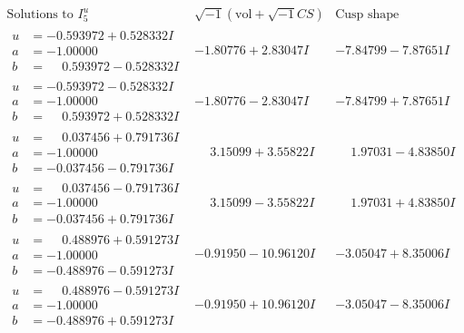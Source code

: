 \documentclass[1p]{elsarticle_modified}
\theoremstyle{definition}
\newcommand{\I}{\sqrt{-1}}
\begin{document}
$$\begin{array}{c|c|c}  
\text{Solutions to }I^u_{5}& \I (\text{vol} + \sqrt{-1}CS) & \text{Cusp shape}\\
 \hline 
\begin{aligned}
u &= -0.593972 + 0.528332 I \\
a &= -1.00000\phantom{ +0.000000I} \\
b &= \phantom{-}0.593972 - 0.528332 I\end{aligned}
 & -1.80776 + 2.83047 I & -7.84799 - 7.87651 I \\ \hline\begin{aligned}
u &= -0.593972 - 0.528332 I \\
a &= -1.00000\phantom{ +0.000000I} \\
b &= \phantom{-}0.593972 + 0.528332 I\end{aligned}
 & -1.80776 - 2.83047 I & -7.84799 + 7.87651 I \\ \hline\begin{aligned}
u &= \phantom{-}0.037456 + 0.791736 I \\
a &= -1.00000\phantom{ +0.000000I} \\
b &= -0.037456 - 0.791736 I\end{aligned}
 & \phantom{-}3.15099 + 3.55822 I & \phantom{-}1.97031 - 4.83850 I \\ \hline\begin{aligned}
u &= \phantom{-}0.037456 - 0.791736 I \\
a &= -1.00000\phantom{ +0.000000I} \\
b &= -0.037456 + 0.791736 I\end{aligned}
 & \phantom{-}3.15099 - 3.55822 I & \phantom{-}1.97031 + 4.83850 I \\ \hline\begin{aligned}
u &= \phantom{-}0.488976 + 0.591273 I \\
a &= -1.00000\phantom{ +0.000000I} \\
b &= -0.488976 - 0.591273 I\end{aligned}
 & -0.91950 - 10.96120 I & -3.05047 + 8.35006 I \\ \hline\begin{aligned}
u &= \phantom{-}0.488976 - 0.591273 I \\
a &= -1.00000\phantom{ +0.000000I} \\
b &= -0.488976 + 0.591273 I\end{aligned}
 & -0.91950 + 10.96120 I & -3.05047 - 8.35006 I \\ \hline\begin{aligned}

\end{aligned}
\end{array}$$
\end{document}
